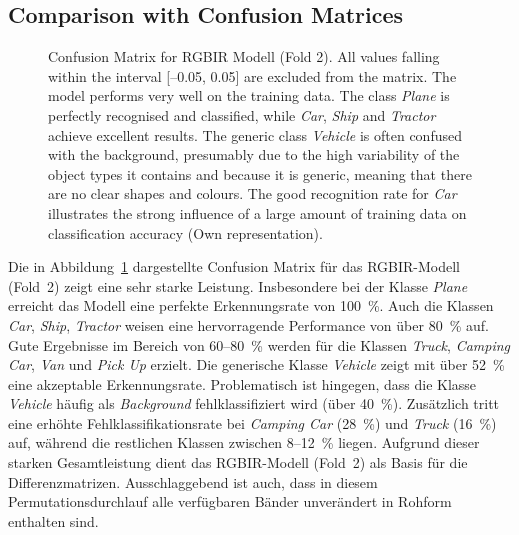 \FloatBarrier
\subsection{Comparison with Confusion Matrices}
\label{subsec:permexp_comp_confusion_matric}


\begin{figure}[htbp]
    \centering
    
    \caption[Confusion Matrix for RGBIR Modell (Fold 2)]{Confusion Matrix for RGBIR Modell (Fold 2). All values falling within the interval [–0.05, 0.05] are excluded from the matrix. The model performs very well on the training data. The class \textit{Plane} is perfectly recognised and classified, while \textit{Car}, \textit{Ship} and \textit{Tractor} achieve excellent results. The generic class \textit{Vehicle} is often confused with the background, presumably due to the high variability of the object types it contains and because it is generic, meaning that there are no clear shapes and colours. The good recognition rate for \textit{Car} illustrates the strong influence of a large amount of training data on classification accuracy (Own representation).}
    \label{fig:perm_exp_confM_rgbir_f2}
\end{figure}

Die in Abbildung~\ref{fig:perm_exp_confM_rgbir_f2} dargestellte Confusion Matrix für das RGBIR-Modell (Fold~2) zeigt eine sehr starke Leistung. Insbesondere bei der Klasse \textit{Plane} erreicht das Modell eine perfekte Erkennungsrate von 100~\%. Auch die Klassen \textit{Car}, \textit{Ship}, \textit{Tractor} weisen eine hervorragende Performance von über 80~\% auf. Gute Ergebnisse im Bereich von 60–80~\% werden für die Klassen \textit{Truck}, \textit{Camping Car}, \textit{Van} und \textit{Pick Up} erzielt. Die generische Klasse \textit{Vehicle} zeigt mit über 52~\% eine akzeptable Erkennungsrate. Problematisch ist hingegen, dass die Klasse \textit{Vehicle} häufig als \textit{Background} fehlklassifiziert wird (über 40~\%). Zusätzlich tritt eine erhöhte Fehlklassifikationsrate bei \textit{Camping Car} (28~\%) und \textit{Truck} (16~\%) auf, während die restlichen Klassen zwischen 8–12~\% liegen. Aufgrund dieser starken Gesamtleistung dient das RGBIR-Modell (Fold~2) als Basis für die Differenzmatrizen. Ausschlaggebend ist auch, dass in diesem Permutationsdurchlauf alle verfügbaren Bänder unverändert in Rohform enthalten sind.



